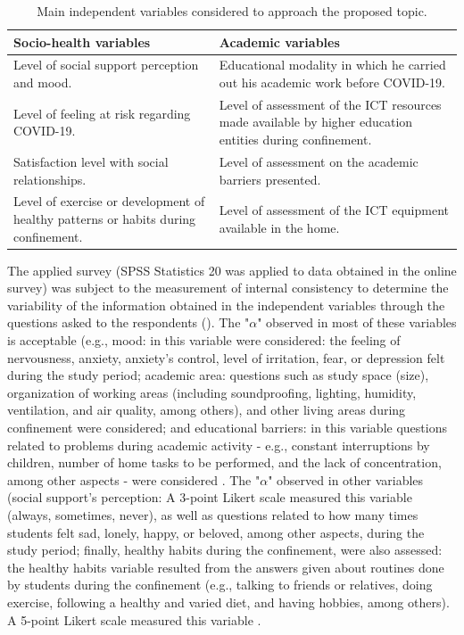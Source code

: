\documentclass[english]{textolivre}
\begin{document}
\begin{table}[h!]
\centering
\begin{threeparttable}
\caption{Main independent variables considered to approach the proposed topic.}
\label{Table03}
\begin{tabular}{p{}p{}}
\toprule
Socio-health variables & Academic variables \\
\midrule
Level of social support perception and mood. & Educational modality in which he carried out his academic work before COVID-19. \\
Level of feeling at risk regarding COVID-19. & Level of assessment of the ICT resources made available by higher education entities during confinement.\\
Satisfaction level with social relationships. & Level of assessment on the academic barriers presented. \\
Level of exercise or development of healthy patterns or habits during confinement. & Level of assessment of the ICT equipment available in the home.\\
\bottomrule
\end{tabular}
\end{threeparttable}
\end{table}

The applied survey (SPSS Statistics 20 was applied to data obtained in the online survey) was subject to the measurement of internal consistency to determine the variability of the information obtained in the independent variables through the questions asked to the respondents (). The "$\alpha$" observed in most of these variables is acceptable (e.g., mood:  in this variable were considered: the feeling of nervousness, anxiety, anxiety's control, level of irritation, fear, or depression felt during the study period; academic area: questions such as study space (size), organization of working areas (including soundproofing, lighting, humidity, ventilation, and air quality, among others), and other living areas during confinement were considered; and educational barriers: in this variable questions related to problems during academic activity - e.g., constant interruptions by children, number of home tasks to be performed, and the lack of concentration, among other aspects - were considered \cite{loewenthal_introduction_1996,nunnally_psychometric_1978}. The "$\alpha$" observed in other variables (social support's perception: A 3-point Likert scale measured this variable (always, sometimes, never), as well as questions related to how many times students felt sad, lonely, happy, or beloved, among other aspects, during the study period; finally, healthy habits during the confinement, were also assessed: the healthy habits variable resulted from the answers given about routines done by students during the confinement (e.g., talking to friends or relatives, doing exercise, following a healthy and varied diet, and having hobbies, among others). A 5-point Likert scale measured this variable \cite{magnusson_teoritest_1978,nunnally_psychometric_1978}.
\end{document}
